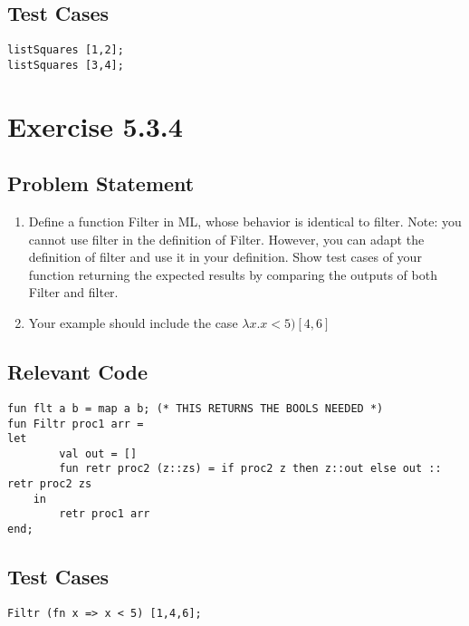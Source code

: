 \documentclass[twoside]{report}
\begin{document}
\section{Test Cases}
\begin{scriptsize}
    \begin{verbatim}
listSquares [1,2];
listSquares [3,4];
    \end{verbatim}
\end{scriptsize}

\chapter{Exercise 5.3.4}
\label{cha:5-3-4}
\section{Problem Statement}
\begin{enumerate}
    \item Define a function Filter in ML, whose behavior is identical to filter. Note: you cannot use filter in the definition of Filter. However, you can adapt the definition of filter and use it in your definition. Show test cases of your function returning the expected results by comparing the outputs of both Filter and filter. 
    \item Your example should include the case $\lambda x.x < 5)[4,6]$
\end{enumerate}
\section{Relevant Code}
\begin{scriptsize}
    \begin{verbatim}
fun flt a b = map a b; (* THIS RETURNS THE BOOLS NEEDED *)
fun Filtr proc1 arr =
let
        val out = []
        fun retr proc2 (z::zs) = if proc2 z then z::out else out :: retr proc2 zs
    in
        retr proc1 arr
end;
    \end{verbatim}
\end{scriptsize}
\section{Test Cases}
\begin{scriptsize}
    \begin{verbatim}
Filtr (fn x => x < 5) [1,4,6];
    \end{verbatim}
\end{scriptsize}
\end{document}
